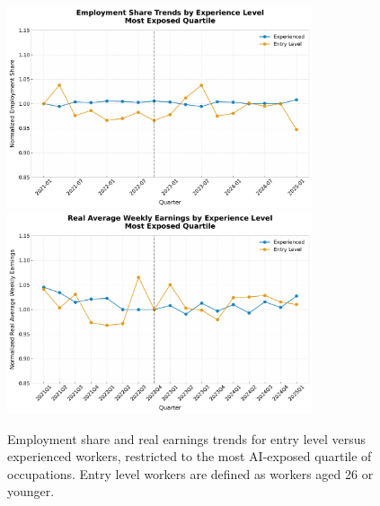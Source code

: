 \documentclass[12pt]{article}
\numberwithin{equation}{section}
\theoremstyle{theorem}\newcustomtheorem{theorem}{{\bf\sc Theorem}}
\theoremstyle{definition}\newcustomtheorem{assumption}{{\bf\sc Assumption}}
\theoremstyle{theorem} \newcustomtheorem{proposition}{{\bf\sc Proposition}}
\begin{document}
\begin{figure}[htbp]
	\centering
  \includegraphics[width=0.8\textwidth]{../figures/employment_share_entry_level_2021Q1.pdf}
  \includegraphics[width=0.8\textwidth]{../figures/real_earnings_by_entry_level_exposed.pdf}
	\caption{Employment share and real earnings trends for entry level versus experienced workers, restricted to the most AI-exposed quartile of occupations. Entry level workers are defined as workers aged 26 or younger. }
	\label{fig:employment_share_entry_level_2021Q1}
\end{figure}
\end{document}
